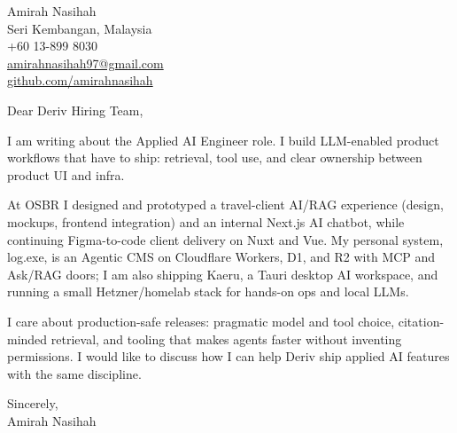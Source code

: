 \documentclass[11pt]{article}
\begin{document}
\begin{flushleft}
Amirah Nasihah\\
Seri Kembangan, Malaysia\\
+60 13-899 8030\\
\href{mailto:amirahnasihah97@gmail.com}{amirahnasihah97@gmail.com}\\
\href{https://github.com/amirahnasihah}{github.com/amirahnasihah}
\end{flushleft}

\vspace{12pt}
\noindent Dear Deriv Hiring Team,

I am writing about the Applied AI Engineer role. I build LLM-enabled product
workflows that have to ship: retrieval, tool use, and clear ownership between
product UI and infra.

At OSBR I designed and prototyped a travel-client AI/RAG experience (design,
mockups, frontend integration) and an internal Next.js AI chatbot, while
continuing Figma-to-code client delivery on Nuxt and Vue. My personal system,
log.exe, is an Agentic CMS on Cloudflare Workers, D1, and R2 with MCP and
Ask/RAG doors; I am also shipping Kaeru, a Tauri desktop AI workspace, and
running a small Hetzner/homelab stack for hands-on ops and local LLMs.

I care about production-safe releases: pragmatic model and tool choice,
citation-minded retrieval, and tooling that makes agents faster without
inventing permissions. I would like to discuss how I can help Deriv ship
applied AI features with the same discipline.

\vspace{12pt}
\noindent Sincerely,\\
Amirah Nasihah
\end{document}
